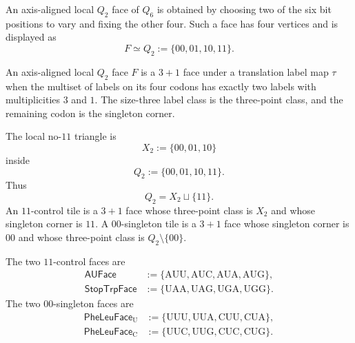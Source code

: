\begin{definition}
\label{def:philosophy-axis-aligned-local-q-two-face}
An axis-aligned local $Q_{2}$ face of $Q_{6}$ is obtained by choosing two
of the six bit positions to vary and fixing the other four. Such a face
has four vertices and is displayed as
$$
  F\simeq Q_{2}:=\{00,01,10,11\}.
$$
\end{definition}

\begin{definition}
\label{def:philosophy-three-plus-one-face}
An axis-aligned local $Q_{2}$ face $F$ is a $3+1$ face under a translation
label map $\tau$ when the multiset of labels on its four codons has
exactly two labels with multiplicities $3$ and $1$. The size-three label
class is the three-point class, and the remaining codon is the singleton
corner.
\end{definition}

\begin{definition}
\label{def:philosophy-local-two-bit-tile}
The local no-$11$ triangle is
$$
  X_{2}:=\{00,01,10\}
$$
inside
$$
  Q_{2}:=\{00,01,10,11\}.
$$
Thus
$$
  Q_{2}=X_{2}\sqcup\{11\}.
$$
An $11$-control tile is a $3+1$ face whose three-point class is $X_{2}$
and whose singleton corner is $11$. A $00$-singleton tile is a $3+1$ face
whose singleton corner is $00$ and whose three-point class is
$Q_{2}\setminus\{00\}$.
\end{definition}


\begin{definition}
\label{def:philosophy-local-codon-q-two-face}
The two $11$-control faces are
$$
\begin{aligned}
  \mathsf{AUFace}
    &:=\{\mathrm{AUU},\mathrm{AUC},\mathrm{AUA},\mathrm{AUG}\},\\
  \mathsf{StopTrpFace}
    &:=\{\mathrm{UAA},\mathrm{UAG},\mathrm{UGA},\mathrm{UGG}\}.
\end{aligned}
$$
The two $00$-singleton faces are
$$
\begin{aligned}
  \mathsf{PheLeuFace}_{\mathrm{U}}
    &:=
      \{\mathrm{UUU},\mathrm{UUA},\mathrm{CUU},\mathrm{CUA}\},\\
  \mathsf{PheLeuFace}_{\mathrm{C}}
    &:=
      \{\mathrm{UUC},\mathrm{UUG},\mathrm{CUC},\mathrm{CUG}\}.
\end{aligned}
$$
\end{definition}

